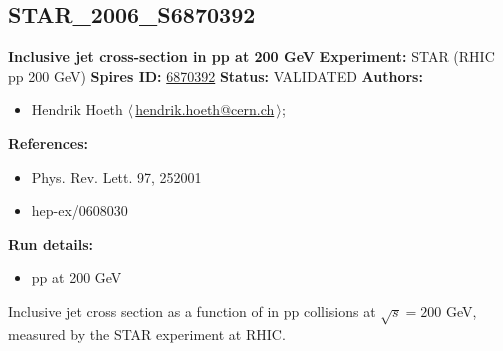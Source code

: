 \subsection[STAR\_2006\_S6870392]{STAR\_2006\_S6870392\,\cite{Abelev:2006uq}}
\textbf{Inclusive jet cross-section in pp at 200 GeV}\newline
\textbf{Experiment:} STAR (RHIC pp 200 GeV) \newline
\textbf{Spires ID:} \href{http://www.slac.stanford.edu/spires/find/hep/www?rawcmd=key+6870392}{6870392}\newline
\textbf{Status:} VALIDATED\newline
\textbf{Authors:}
\begin{itemize}
  \item Hendrik Hoeth $\langle\,$\href{mailto:hendrik.hoeth@cern.ch}{hendrik.hoeth@cern.ch}$\,\rangle$;
\end{itemize}
\textbf{References:}
\begin{itemize}
  \item Phys. Rev. Lett. 97, 252001
  \item hep-ex/0608030
\end{itemize}
\textbf{Run details:}
\begin{itemize}

  \item pp at 200 GeV\end{itemize}

\noindent Inclusive jet cross section as a function of \pT in pp collisions  at $\sqrt{s} = 200$ GeV, measured by the STAR experiment at RHIC.

\clearpage


\clearpage

